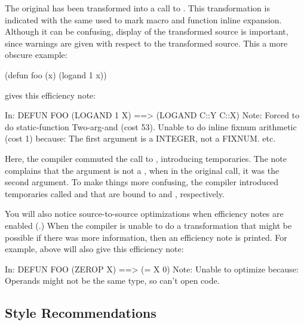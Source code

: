 The original  has been transformed into a call to
\code{=}.  This transformation is indicated with the same \code{==$>$}
used to mark macro and function inline expansion.  Although it can be
confusing, display of the transformed source is important, since
warnings are given with respect to the transformed source.  This a
more obscure example:

\begin{lisp}
(defun foo (x) (logand 1 x))
\end{lisp}

gives this efficiency note:

\begin{example}
In: DEFUN FOO
  (LOGAND 1 X)
==>
  (LOGAND C::Y C::X)
Note: Forced to do static-function Two-arg-and (cost 53).
      Unable to do inline fixnum arithmetic (cost 1) because:
      The first argument is a INTEGER, not a FIXNUM.
      etc.
\end{example}

Here, the compiler commuted the call to , introducing
temporaries.  The note complains that the  argument is not
a , when in the original call, it was the second
argument.  To make things more confusing, the compiler introduced
temporaries called  and  that are bound to
 and , respectively.

You will also notice source-to-source optimizations when efficiency
notes are enabled (.)  When the compiler is
unable to do a transformation that might be possible if there was more
information, then an efficiency note is printed.  For example,
 above will also give this efficiency note:
\begin{example}
In: DEFUN FOO
  (ZEROP X)
==>
  (= X 0)
Note: Unable to optimize because:
      Operands might not be the same type, so can't open code.
\end{example}


\subsection{Style Recommendations}

